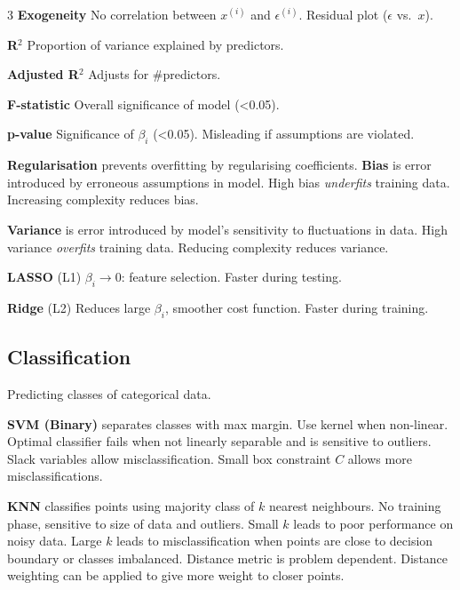 \documentclass{article}
\begin{document}
\begin{multicols}{3}
    \textbf{Exogeneity} No correlation between \(x^{\left( i \right)}\) and \(\epsilon^{\left( i \right)}\).
    Residual plot (\(\epsilon\) vs.\ \(x\)).

    \textbf{R\({}^2\)} Proportion of variance explained by predictors.

    \textbf{Adjusted R\({}^2\)} Adjusts for \#predictors.

    \textbf{F-statistic} Overall significance of model (<0.05).

    \textbf{p-value} Significance of \(\beta_i\) (<0.05).
    Misleading if assumptions are violated.

    \textbf{Regularisation} prevents overfitting by regularising coefficients.
    \textbf{Bias} is error introduced by erroneous assumptions in model.
    High bias \textit{underfits} training data. Increasing complexity reduces bias.

    \textbf{Variance} is error introduced by model's sensitivity to fluctuations in data.
    High variance \textit{overfits} training data. Reducing complexity reduces variance.

    \textbf{LASSO} (L1) \(\beta_i \to 0\): feature selection. Faster during testing.

    \textbf{Ridge} (L2) Reduces large \(\beta_i\), smoother cost function. Faster during
    training.
    \subsection{Classification}
    Predicting classes of categorical data.

    \textbf{SVM (Binary)} separates classes with max margin. Use kernel
    when non-linear. Optimal classifier fails when not
    linearly separable and is sensitive to outliers. Slack variables
    allow misclassification. Small box constraint \(C\) allows more
    misclassifications.

    \textbf{KNN} classifies points using majority class
    of \(k\) nearest neighbours.
    No training phase, sensitive to size of data and outliers. Small
    \(k\) leads to poor performance on noisy data. Large \(k\) leads to
    misclassification when points are close to decision boundary or
    classes imbalanced. Distance metric is problem dependent.
    Distance weighting can be applied to give more weight to closer
    points.


\end{multicols}
\end{document}
